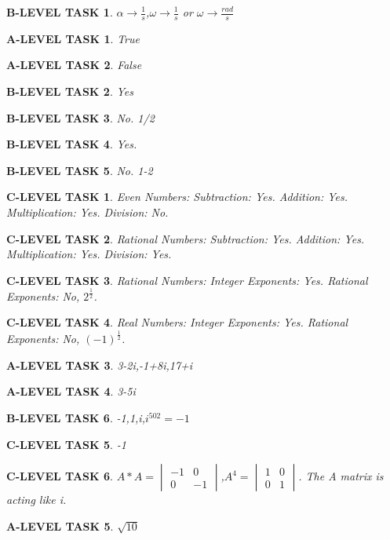 \documentclass{book}
\numberwithin{equation}{section}
\newtheorem{alevel}{A-LEVEL TASK}
\newtheorem{blevel}{B-LEVEL TASK}
\newtheorem{clevel}{C-LEVEL TASK}
\theoremstyle{definition}
\begin{document}
\begin{blevel}$\alpha \rightarrow \frac{1}{s}$,$\omega \rightarrow \frac{1}{s}$ or $\omega \rightarrow \frac{rad}{s}$\end{blevel}
\begin{alevel}True\end{alevel}
\begin{alevel}False\end{alevel}
\begin{blevel}Yes\end{blevel}
\begin{blevel}No. 1/2\end{blevel}
\begin{blevel}Yes.\end{blevel}
\begin{blevel}No. 1-2\end{blevel}
\begin{clevel}Even Numbers: Subtraction: Yes. Addition: Yes. Multiplication: Yes. Division: No.\end{clevel}
\begin{clevel}Rational Numbers: Subtraction: Yes. Addition: Yes. Multiplication: Yes. Division: Yes.\end{clevel}
\begin{clevel}Rational Numbers: Integer Exponents: Yes. Rational Exponents: No, $2^{\frac{1}{2}}$.\end{clevel}
\begin{clevel}Real Numbers: Integer Exponents: Yes. Rational Exponents: No, $(-1)^{\frac{1}{2}}$.\end{clevel}

\begin{alevel}3-2i,-1+8i,17+i\end{alevel}
\begin{alevel}3-5i\end{alevel}
\begin{blevel}-1,1,i,$i^502=-1$\end{blevel}
\begin{clevel}-1\end{clevel}
\begin{clevel}$A*A=\begin{vmatrix} -1&0 \\ 0&-1\end{vmatrix}$,$A^4=\begin{vmatrix} 1&0 \\ 0&1\end{vmatrix}$. The A matrix is acting like i.\end{clevel}
\begin{alevel}$\sqrt{10}$\end{alevel}
\end{document}
